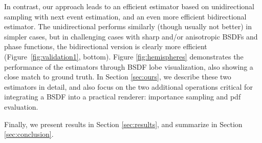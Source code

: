 In contrast, our approach leads to an efficient estimator based on unidirectional sampling with next event estimation, and an even more efficient bidirectional estimator. The unidirectional performs similarly (though usually not better) in simpler cases, but in challenging cases with sharp and/or anisotropic BSDFs and phase functions, the bidirectional version is clearly more efficient (Figure~\ref{fig:validation1}, bottom). Figure \ref{fig:hemispheres} demonstrates the performance of the estimators through BSDF lobe visualization, also showing a close match to ground truth. In Section \ref{sec:ours}, we describe these two estimators in detail, and also focus on the two additional operations critical for integrating a BSDF into a practical renderer: importance sampling and pdf evaluation.

Finally, we present results in Section \ref{sec:results}, and summarize in Section \ref{sec:conclusion}.




